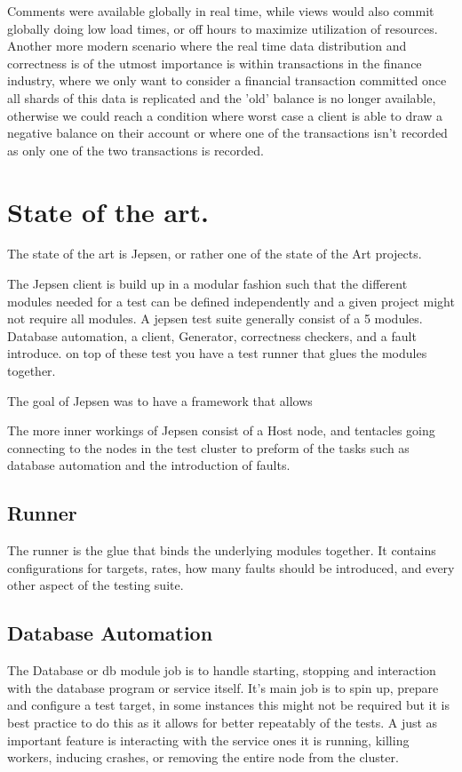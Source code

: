 \documentclass[a4paper,10pt,titlepage]{report}
\begin{document}
    Comments were available globally in real time, while views would also commit globally doing low load times, or off hours to maximize utilization of resources.\\
    \vspace{5mm}
    Another more modern scenario where the real time data distribution and correctness is of the utmost importance is within transactions in the finance industry,  where we only want to consider a financial transaction committed once all shards of this data is replicated and the 'old' balance is no longer available, otherwise we could reach a condition where worst case a client is able to draw a negative balance on their account or where one of the transactions isn't recorded as only one of the two transactions is recorded.\\


    \section{State of the art.}

    The state of the art is Jepsen, or rather one of the state of the Art projects.
    
    The Jepsen client is build up in a modular fashion such that the different modules needed for a test can be defined independently and a given project might not require all modules. A jepsen test suite generally consist of a 5 modules. Database automation, a client, Generator, correctness checkers, and a fault introduce. on top of these test you have a test runner that glues the modules together.
    
    The goal of Jepsen was to have a framework that allows 
    
    The more inner workings of Jepsen consist of a Host node, and tentacles going connecting to the nodes in the test cluster to preform of the tasks such as database automation and the introduction of faults.
    
    \subsection{Runner}
    
    The runner is the glue that binds the underlying modules together. It contains configurations for targets, rates, how many faults should be introduced, and every other aspect of the testing suite.
    
    \subsection{Database Automation}
     The Database or db module job is to handle starting, stopping and interaction with the database program or service itself. It's main job is to spin up, prepare and configure a test target, in some instances this might not be required but it is best practice to do this as it allows for better repeatably of the tests. A just as important feature is interacting with the service ones it is running, killing workers, inducing crashes, or removing the entire node from the cluster.
    
\end{document}

